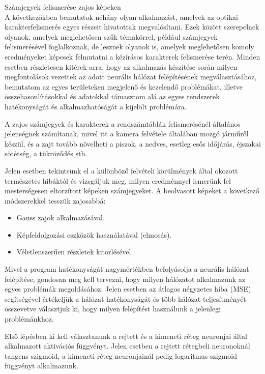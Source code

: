 Számjegyek felismerése zajos képeken\\

A következőkben bemutatok néhány olyan alkalmazást, amelyek az optikai karakterfelismerés egyes részeit hivatottak megvalósítani. Ezek között szerepelnek olyanok, amelyek meglehetősen szűk témakörrel, például számjegyek felismerésével foglalkoznak, de lesznek olyanok is, amelyek meglehetősen komoly eredményeket képesek felmutatni a kézírásos karakterek felismerése terén. Minden esetben részletesen kitérek arra, hogy az alkalmazás készítése során milyen megfontolások vezettek az adott neurális hálózat felépítésének megválasztásához, bemutatom az egyes területeken megjelenő és kezelendő problémákat, illetve összehasonlításokkal és adatokkal támasztom alá az egyes rendszerek hatékonyságát és alkalmazhatóságát a kijelölt problémára. 

A zajos számjegyek és karakterek a rendszámtáblák felismerésénél általános jelenségnek számítanak, mivel itt a kamera felvétele általában mozgó járműről készül, és a zajt tovább növelheti a piszok, a nedves, esetleg esős időjárás, éjszakai sötétség, a tükröződés stb.

Jelen esetben tekintsünk el a különböző felvételi körülmények által okozott természetes hibáktól és vizsgáljuk meg, milyen eredménnyel ismerünk fel mesterségesen eltorzított képeken számjegyeket. A beolvasott képeket a következő módszerekkel tesszük zajosabbá: 

\begin{itemize}
\item Gauss zajok alkalmazásával. 
\item Képfeldolgozási eszközök használatával (elmosás). 
\item Véletlenszerűen részletek kitörlésével. 
\end{itemize}

Mivel a program hatékonyságát nagymértékben befolyásolja a neurális hálózat felépítése, gondosan meg kell tervezni, hogy milyen hálózatot alkalmazunk az egyes problémák megoldásához. Jelen esetben az átlagos négyzetes hiba (MSE) segítségével értékeljük a hálózat hatékonyságát és több hálózat teljesítményét összevetve választjuk ki, hogy milyen felépítést használunk a jelenlegi problémánkhoz. 

Első lépésben ki kell választanunk a rejtett és a kimeneti réteg neuronjai által alkalmazott aktivációs függvényt. Jelen esetben a rejtett rétegbeli neuronoknál tangens szigmoid, a kimeneti réteg neuronjainál pedig logaritmus szigmoid függvényt alkalmazunk. 

